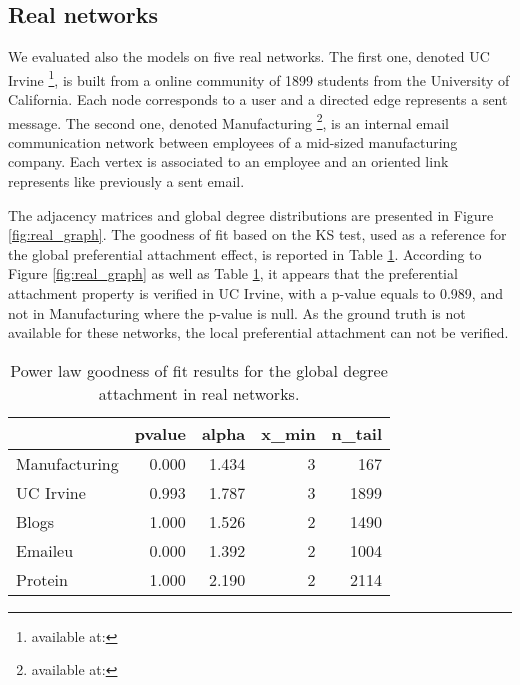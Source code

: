 \documentclass[a4paper, 12pt]{article}
\newcommand*{\lpath}{./}%
\begin{document}
\subsection{Real networks}

We evaluated also the models on five real networks.
The first one, denoted UC Irvine \footnote{available at:}, is built from a online community of 1899 students from the University of California. Each node corresponds to a user and a   directed edge represents a sent message.
The second one, denoted Manufacturing \footnote{available at:}, is an internal email communication network between employees of a mid-sized manufacturing company. Each vertex is associated  to an employee and an oriented link represents like previously a sent email.

The adjacency matrices and global degree distributions are presented in Figure \ref{fig:real_graph}. The goodness of fit based on the KS test, used as a reference for the global preferential attachment effect, is reported in Table \ref{table:real_graph}. According to Figure \ref{fig:real_graph} as well as Table \ref{table:real_graph}, it appears that the preferential attachment property is verified in UC Irvine, with a p-value equals to 0.989, and not in Manufacturing where the p-value is null. As the ground truth is not available for these networks, the local preferential attachment can not be verified.



\begin{table}
\caption{Power law goodness of fit results for the global degree attachment in real networks.}
\centering
\begin{tabular}{lrrrr}
	\hline
	&   pvalue &   alpha &   x\_min &   n\_tail \\
	\hline
	Manufacturing &    0.000 &   1.434 &       3 &      167 \\
	UC Irvine     &    0.993 &   1.787 &       3 &     1899 \\
	Blogs         &    1.000 &   1.526 &       2 &     1490 \\
	Emaileu       &    0.000 &   1.392 &       2 &     1004 \\
	Protein       &    1.000 &   2.190 &       2 &     2114 \\
	\hline
\end{tabular}

\label{table:real_graph}
\end{table}
\end{document}
